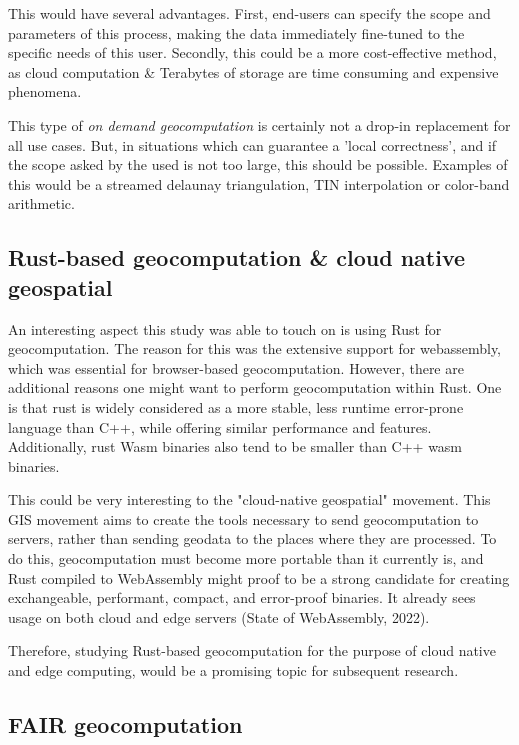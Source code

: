 This would have several advantages. 
First, end-users can specify the scope and parameters of this process, making the data immediately fine-tuned to the specific needs of this user. 
Secondly, this could be a more cost-effective method, as cloud computation \& Terabytes of storage are time consuming and expensive phenomena.

This type of \emph{on demand geocomputation} is certainly not a drop-in replacement for all use cases. 
But, in situations which can guarantee a 'local correctness', and if the scope asked by the used is not too large, this should be possible. 
Examples of this would be a streamed delaunay triangulation, TIN interpolation or color-band arithmetic. 

\subsection{Rust-based geocomputation \& cloud native geospatial}

An interesting aspect this study was able to touch on is using Rust for geocomputation.
The reason for this was the extensive support for webassembly, which was essential for browser-based geocomputation. 
However, there are additional reasons one might want to perform geocomputation within Rust.
One is that rust is widely considered as a more stable, less runtime error-prone language than C++, while offering similar performance and features.
Additionally, rust Wasm binaries also tend to be smaller than C++ wasm binaries.  

This could be very interesting to the "cloud-native geospatial" movement. 
This \ac{GIS} movement aims to create the tools necessary to send geocomputation to servers, rather than sending geodata to the places where they are processed.
To do this, geocomputation must become more portable than it currently is, and Rust compiled to WebAssembly might proof to be a strong candidate for creating exchangeable, performant, compact, and error-proof binaries.
It already sees usage on both cloud and edge servers (State of WebAssembly, 2022).  

Therefore, studying Rust-based geocomputation for the purpose of cloud native and edge computing, would be a promising topic for subsequent research. 

\subsection{FAIR geocomputation}

